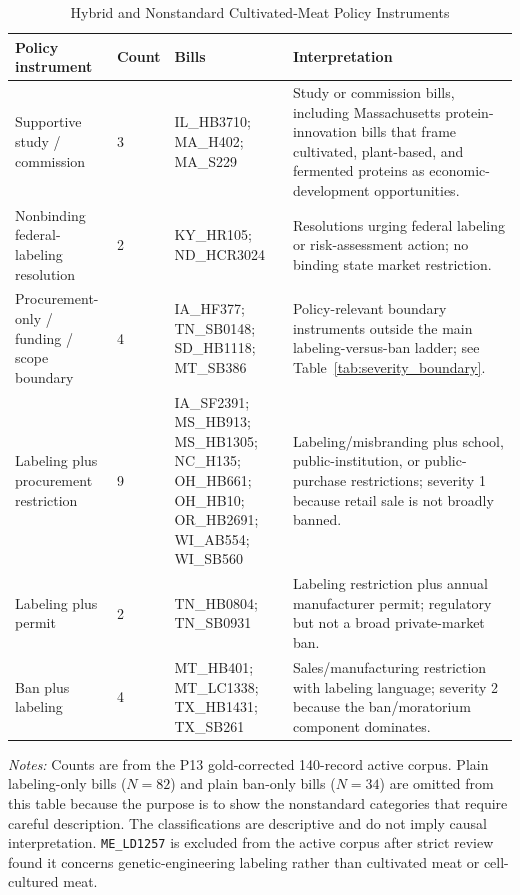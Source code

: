 \documentclass[12pt]{article}
\begin{document}
\begin{table}[htbp]
\centering
\begin{threeparttable}
\caption{Hybrid and Nonstandard Cultivated-Meat Policy Instruments}
\label{tab:hybrid_tools}
\scriptsize
\setlength{\tabcolsep}{3pt}
\renewcommand{\arraystretch}{0.95}
\begin{tabularx}{\textwidth}{p{}p{}p{}Y}
\toprule
Policy instrument & Count & Bills & Interpretation \\
\midrule
Supportive study / commission & 3 & IL\_HB3710; MA\_H402; MA\_S229 & Study or commission bills, including Massachusetts protein-innovation bills that frame cultivated, plant-based, and fermented proteins as economic-development opportunities. \\
\addlinespace
Nonbinding federal-labeling resolution & 2 & KY\_HR105; ND\_HCR3024 & Resolutions urging federal labeling or risk-assessment action; no binding state market restriction. \\
\addlinespace
Procurement-only / funding / scope boundary & 4 & IA\_HF377; TN\_SB0148; SD\_HB1118; MT\_SB386 & Policy-relevant boundary instruments outside the main labeling-versus-ban ladder; see Table~\ref{tab:severity_boundary}. \\
\addlinespace
Labeling plus procurement restriction & 9 & IA\_SF2391; MS\_HB913; MS\_HB1305; NC\_H135; OH\_HB661; OH\_HB10; OR\_HB2691; WI\_AB554; WI\_SB560 & Labeling/misbranding plus school, public-institution, or public-purchase restrictions; severity 1 because retail sale is not broadly banned. \\
\addlinespace
Labeling plus permit & 2 & TN\_HB0804; TN\_SB0931 & Labeling restriction plus annual manufacturer permit; regulatory but not a broad private-market ban. \\
\addlinespace
Ban plus labeling & 4 & MT\_HB401; MT\_LC1338; TX\_HB1431; TX\_SB261 & Sales/manufacturing restriction with labeling language; severity 2 because the ban/moratorium component dominates. \\
\bottomrule
\end{tabularx}
\begin{tablenotes}[flushleft]
\footnotesize
\item \textit{Notes:} Counts are from the P13 gold-corrected 140-record active corpus.  Plain labeling-only bills ($N=82$) and plain ban-only bills ($N=34$) are omitted from this table because the purpose is to show the nonstandard categories that require careful description.  The classifications are descriptive and do not imply causal interpretation.  \texttt{ME\_LD1257} is excluded from the active corpus after strict review found it concerns genetic-engineering labeling rather than cultivated meat or cell-cultured meat.
\end{tablenotes}
\end{threeparttable}
\end{table}
\end{document}
